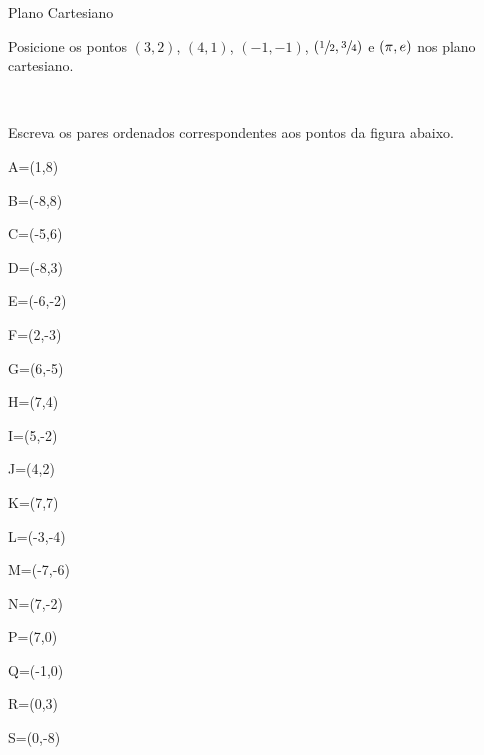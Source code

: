 
\begin{exercicios}{Plano Cartesiano}
    
    \begin{exercicio}
        Posicione os pontos $(3,2)$, $(4,1)$, $(-1,-1)$, $(\sfrac{1}{2},\sfrac{3}{4})$ e $(\pi,e)$ nos plano cartesiano.
        \begin{answers} \(\qquad\)     
        \end{answers}
    \end{exercicio}
    
    \begin{exercicio}
        Escreva os pares ordenados correspondentes aos pontos da figura abaixo.
        \begin{answers}
            \begin{mathlist}[3]
                \item A=(1,8)
                \item B=(-8,8)
                \item C=(-5,6)
                \item D=(-8,3)
                \item E=(-6,-2)
                \item F=(2,-3)
                \item G=(6,-5)
                \item H=(7,4)
                \item I=(5,-2)
                \item J=(4,2)
                \item K=(7,7)
                \item L=(-3,-4)
                \item M=(-7,-6)
                \item N=(7,-2)
                \item P=(7,0)
                \item Q=(-1,0)
                \item R=(0,3)
                \item S=(0,-8)
            \end{mathlist}


\end{answers}
\end{exercicio}
\end{exercicios}
